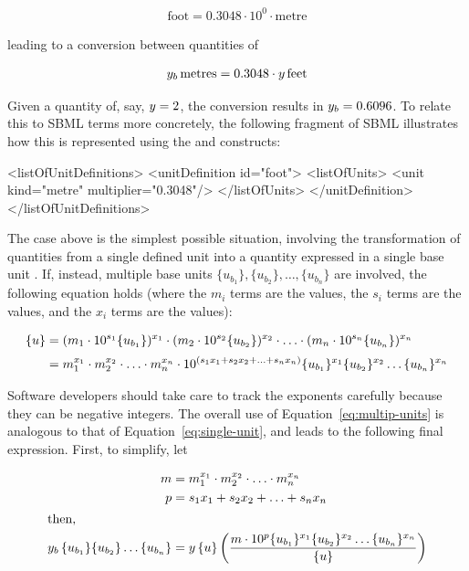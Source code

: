 \begin{linenomath}
\begin{align*}
  \text{foot} = 0.3048 \cdot 10^0 \cdot \text{metre}
\end{align*}
\end{linenomath}
leading to a conversion between quantities of
\begin{linenomath}
\begin{align*}
  y_b \, \text{metres} = 0.3048 \cdot y \, \text{feet}
\end{align*}
\end{linenomath}
Given a quantity of, say, $y = 2$, the conversion results in
$y_b = 0.6096$.  To relate this to SBML terms more concretely,
the following fragment of SBML illustrates how this is represented
using the \Unit and \UnitDefinition constructs:
\begin{example}
<listOfUnitDefinitions>
    <unitDefinition id="foot">
        <listOfUnits>
            <unit kind="metre" multiplier="0.3048"/>
        </listOfUnits>
    </unitDefinition>
</listOfUnitDefinitions>
\end{example}

\newcommand{\uone}{\ensuremath{\{u_{b_1}\}}\xspace}
\newcommand{\utwo}{\ensuremath{\{u_{b_2}\}}\xspace}
\newcommand{\un}  {\ensuremath{\{u_{b_n}\}}\xspace}

The case above is the simplest possible situation, involving the
transformation of quantities from a single defined unit \unew into
a quantity expressed in a single base unit \ubase.  If, instead,
multiple base units $\uone, \utwo, \ldots, \un$ are involved, the
following equation holds (where the $m_i$ terms are the
 values, the $s_i$ terms are the 
values, and the $x_i$ terms are the  values):
\begin{linenomath}
\begin{align}
  \{u\} &= (m_1 \cdot 10^{s_1} \uone)^{x_1} \cdot
  (m_2 \cdot 10^{s_2} \utwo)^{x_2} \cdot \ldots \cdot (m_n \cdot
  10^{s_n} \un)^{x_n} \notag
  \\[2pt]
               &= m_1^{x_1} \cdot m_2^{x_2} \cdot \ldots \cdot m_n^{x_n}
  \cdot 10^{(s_1 x_1 + s_2 x_2 + \ldots + s_n x_n)}
  \uone^{x_1} \utwo^{x_2} \ldots \un^{x_n}
\label{eq:multip-units}
\end{align}
\end{linenomath}
Software developers should take care to track the exponents
carefully because they can be negative integers.  The overall use
of Equation~\ref{eq:multip-units} is analogous to that of
Equation~\ref{eq:single-unit}, and leads to the following final
expression.  First, to simplify, let
\begin{linenomath}
\begin{align}
  m &= m_1^{x_1} \cdot m_2^{x_2} \cdot \ldots \cdot m_n^{x_n} \notag\\
  p &= s_1 x_1 + s_2 x_2 + \ldots + s_n x_n \notag\\
\intertext{then,}
  \ybase \, \uone \utwo \ldots \un
    &= \ynew \, \unew \left(
  \frac{m \cdot 10^p \uone^{x_1} \utwo^{x_2} \ldots \un^{x_n}}{\unew}
  \right)
\end{align}
\end{linenomath}

